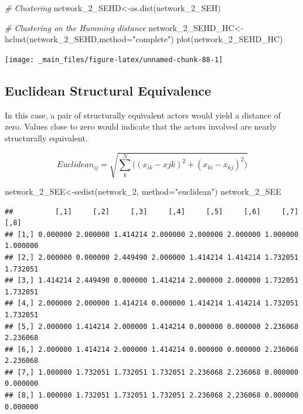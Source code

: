 \documentclass[
  notitlepage,
  onecolumn,
  openany]{book}
\newenvironment{Shaded}{\begin{snugshade}}{\end{snugshade}}
\newcommand{\AttributeTok}[1]{\textcolor[rgb]{0.77,0.63,0.00}{#1}}
\newcommand{\CommentTok}[1]{\textcolor[rgb]{0.56,0.35,0.01}{\textit{#1}}}
\newcommand{\FunctionTok}[1]{\textcolor[rgb]{0.00,0.00,0.00}{#1}}
\newcommand{\NormalTok}[1]{#1}
\newcommand{\OtherTok}[1]{\textcolor[rgb]{0.56,0.35,0.01}{#1}}
\newcommand{\StringTok}[1]{\textcolor[rgb]{0.31,0.60,0.02}{#1}}
\begin{document}
\begin{Shaded}
\begin{Highlighting}[]
\CommentTok{\# Clustering}
\NormalTok{network\_2\_SEHD}\OtherTok{\textless{}{-}}\FunctionTok{as.dist}\NormalTok{(network\_2\_SEH)}

\CommentTok{\# Clustering on the Humming distance}
\NormalTok{network\_2\_SEHD\_HC}\OtherTok{\textless{}{-}}\FunctionTok{hclust}\NormalTok{(network\_2\_SEHD,}\AttributeTok{method=}\StringTok{"complete"}\NormalTok{)}
\FunctionTok{plot}\NormalTok{(network\_2\_SEHD\_HC)}
\end{Highlighting}
\end{Shaded}

\texttt{[image: \_main\_files/figure-latex/unnamed-chunk-88-1]}

\hypertarget{euclidean-structural-equivalence}{%
\subsection{Euclidean Structural Equivalence}\label{euclidean-structural-equivalence}}

In this case, a pair of structurally equivalent actors would yield a distance of zero. Values close to zero would indicate that the actors involved are nearly structurally equivalent.

\[
Euclidean_{ij} = \sqrt{\sum_k^N \Big((x_{ik}-x{jk})^2+(x_{ki}-x_{kj})^2\Big)}
\]

\begin{Shaded}
\begin{Highlighting}[]
\NormalTok{network\_2\_SEE}\OtherTok{\textless{}{-}}\FunctionTok{sedist}\NormalTok{(network\_2, }\AttributeTok{method=}\StringTok{"euclidean"}\NormalTok{)}
\NormalTok{network\_2\_SEE}
\end{Highlighting}
\end{Shaded}

\begin{verbatim}
##          [,1]     [,2]     [,3]     [,4]     [,5]     [,6]     [,7]     [,8]
## [1,] 0.000000 2.000000 1.414214 2.000000 2.000000 2.000000 1.000000 1.000000
## [2,] 2.000000 0.000000 2.449490 2.000000 1.414214 1.414214 1.732051 1.732051
## [3,] 1.414214 2.449490 0.000000 1.414214 2.000000 2.000000 1.732051 1.732051
## [4,] 2.000000 2.000000 1.414214 0.000000 1.414214 1.414214 1.732051 1.732051
## [5,] 2.000000 1.414214 2.000000 1.414214 0.000000 0.000000 2.236068 2.236068
## [6,] 2.000000 1.414214 2.000000 1.414214 0.000000 0.000000 2.236068 2.236068
## [7,] 1.000000 1.732051 1.732051 1.732051 2.236068 2.236068 0.000000 0.000000
## [8,] 1.000000 1.732051 1.732051 1.732051 2.236068 2.236068 0.000000 0.000000
\end{verbatim}
\end{document}
